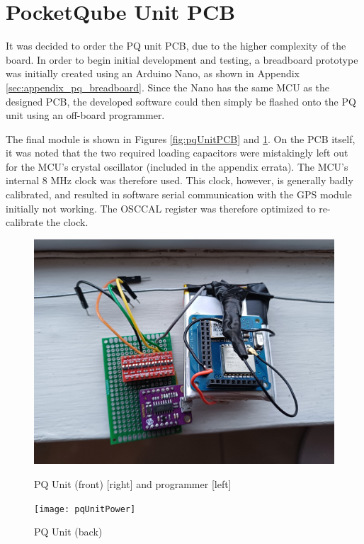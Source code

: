 \graphicspath{{./figures}}

\section{PocketQube Unit PCB}

It was decided to order the PQ unit PCB, due to the higher complexity of the board. In order to begin initial development and testing, a breadboard prototype was initially created using an Arduino Nano, as shown in Appendix \ref{sec:appendix_pq_breadboard}. Since the Nano has the same MCU as the designed PCB, the developed software could then simply be flashed onto the PQ unit using an off-board programmer.

The final module is shown in Figures \ref{fig:pqUnitPCB} and \ref{fig:pqUnitPower}. On the PCB itself, it was noted that the two required loading capacitors were mistakingly left out for the MCU's crystal oscillator (included in the appendix errata). The MCU's internal 8 MHz clock was therefore used. This clock, however, is generally badly calibrated, and resulted in software serial communication with the GPS module initially not working. The OSCCAL register was therefore optimized to re-calibrate the clock.

\begin{figure}[!htb]
  \begin{minipage}{.49\textwidth}
    \centering
    \includegraphics[width=0.85\linewidth]{pqUnitPCB}
    \caption{PQ Unit (front) [right] and programmer [left]}
    \label{fig:pqUnitPCB}
  \end{minipage}
  \begin{minipage}{.49\textwidth}
    \centering
    \texttt{[image: pqUnitPower]}
    \caption{PQ Unit (back)}
    \label{fig:pqUnitPower}
  \end{minipage}
\end{figure}

